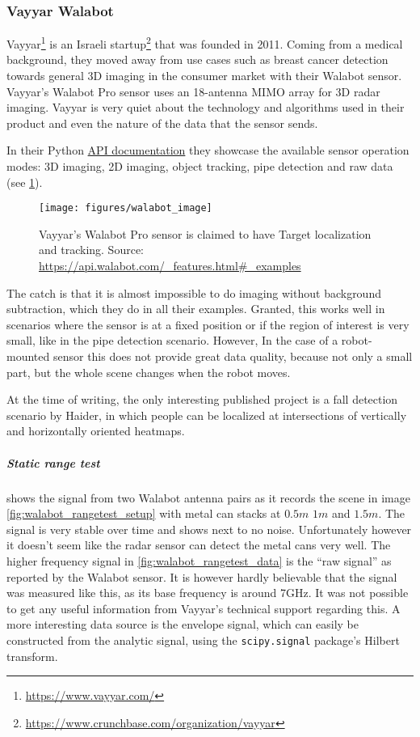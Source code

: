 \subsubsection{Vayyar Walabot}\label{walabot}

Vayyar\footnote{\url{https://www.vayyar.com/}} is an Israeli
startup\footnote{\url{https://www.crunchbase.com/organization/vayyar}} that was founded in 2011. Coming from a medical background, they moved away from use cases such as breast cancer detection towards general 3D imaging in the consumer market with their Walabot sensor. Vayyar's Walabot Pro sensor uses an 18-antenna MIMO array for 3D radar imaging. Vayyar is very quiet about the technology and algorithms used in their product and even the nature of the data that the sensor sends.

In their Python \href{https://api.walabot.com}{API documentation} they showcase the available sensor operation modes: 3D imaging, 2D imaging, object tracking, pipe detection and raw data (see \cref{fig:walabot_image}).

\begin{figure}[htbp]
    \centering
    \texttt{[image: figures/walabot\_image]}
    \caption{Vayyar's Walabot Pro sensor is claimed to have Target localization and tracking. Source: \url{https://api.walabot.com/\_features.html\#\_examples}}
    \label{fig:walabot_image}
\end{figure}

The catch is that it is almost impossible to do imaging without background subtraction, which they do in all their examples. Granted, this works well in scenarios where the sensor is at a fixed position or if the region of interest is very small, like in the pipe detection scenario. However, In the case of a robot-mounted sensor this does not provide great data quality, because not only a small part, but the whole scene changes when the robot moves.

At the time of writing, the only interesting published project is a fall detection scenario \cite{Haider2017} by Haider, in which people can be localized at intersections of vertically and horizontally oriented heatmaps.

\subparagraph{Static range test}\label{static-range-test}

 shows the signal from two Walabot antenna pairs as it records the scene in image \cref{fig:walabot_rangetest_setup} with metal can stacks at \(0.5m\) \(1m\) and \(1.5m\). The signal is very stable over time and shows next to no noise. Unfortunately however it doesn't seem like the radar sensor can detect the metal cans very well. The higher frequency signal in \cref{fig:walabot_rangetest_data} is the ``raw signal'' as reported by the Walabot sensor. It is however hardly believable that the signal was measured like this, as its base frequency is around 7GHz. It was not possible to get any useful information from Vayyar's technical support regarding this. A more interesting data source is the envelope signal, which can easily be constructed from the analytic signal, using the \texttt{scipy.signal} package's Hilbert transform.

